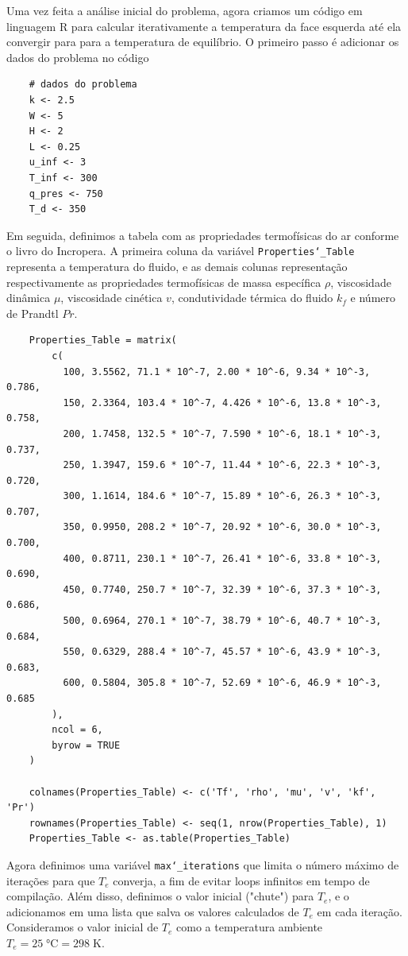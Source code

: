 \documentclass[12pt]{scrartcl}
\newcommand{\un}[1]{\;\textrm{#1}}
\newcommand{\code}[1]{\texttt{#1}}
\begin{document}
Uma vez feita a análise inicial do problema, agora criamos um código em linguagem R para 
calcular iterativamente a temperatura da face esquerda até ela convergir para 
para a temperatura de equilíbrio. O primeiro passo é adicionar os dados do problema no código  

\begin{lstlisting}
    # dados do problema
    k <- 2.5
    W <- 5
    H <- 2
    L <- 0.25
    u_inf <- 3
    T_inf <- 300
    q_pres <- 750
    T_d <- 350
\end{lstlisting}

Em seguida, definimos a tabela com as propriedades termofísicas do ar conforme o livro
do Incropera. A primeira coluna da variável \code{Properties\char`_Table} representa a temperatura do fluido, e as demais colunas representação
respectivamente as propriedades termofísicas de massa específica $\rho$, viscosidade dinâmica $\mu$, viscosidade
cinética $v$, condutividade térmica do fluido $k_f$ e número de Prandtl $Pr$.

\begin{lstlisting}
    Properties_Table = matrix(
        c(
          100, 3.5562, 71.1 * 10^-7, 2.00 * 10^-6, 9.34 * 10^-3, 0.786,
          150, 2.3364, 103.4 * 10^-7, 4.426 * 10^-6, 13.8 * 10^-3, 0.758,
          200, 1.7458, 132.5 * 10^-7, 7.590 * 10^-6, 18.1 * 10^-3, 0.737,
          250, 1.3947, 159.6 * 10^-7, 11.44 * 10^-6, 22.3 * 10^-3, 0.720,
          300, 1.1614, 184.6 * 10^-7, 15.89 * 10^-6, 26.3 * 10^-3, 0.707,
          350, 0.9950, 208.2 * 10^-7, 20.92 * 10^-6, 30.0 * 10^-3, 0.700,
          400, 0.8711, 230.1 * 10^-7, 26.41 * 10^-6, 33.8 * 10^-3, 0.690,
          450, 0.7740, 250.7 * 10^-7, 32.39 * 10^-6, 37.3 * 10^-3, 0.686,
          500, 0.6964, 270.1 * 10^-7, 38.79 * 10^-6, 40.7 * 10^-3, 0.684,
          550, 0.6329, 288.4 * 10^-7, 45.57 * 10^-6, 43.9 * 10^-3, 0.683,
          600, 0.5804, 305.8 * 10^-7, 52.69 * 10^-6, 46.9 * 10^-3, 0.685
        ),
        ncol = 6,
        byrow = TRUE
    )
      
    colnames(Properties_Table) <- c('Tf', 'rho', 'mu', 'v', 'kf', 'Pr')
    rownames(Properties_Table) <- seq(1, nrow(Properties_Table), 1)
    Properties_Table <- as.table(Properties_Table)
\end{lstlisting}

Agora definimos uma variável \code{max\char`_iterations} que limita o número máximo de
iterações para que $T_e$ converja, a fim de evitar loops infinitos em tempo de compilação.
Além disso, definimos o valor inicial ("chute") para $T_e$, e o adicionamos em uma lista
que salva os valores calculados de $T_e$ em cada iteração. Consideramos o valor inicial de
$T_e$ como a temperatura ambiente $T_e = 25 \un{°C} = 298 \un{K}$.
\end{document}
